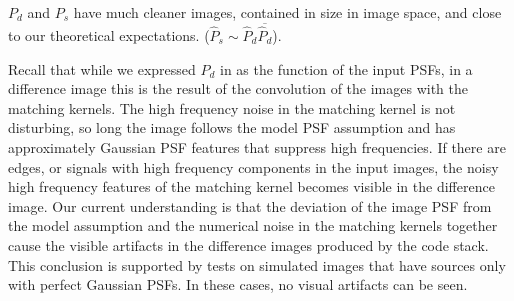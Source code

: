 %
\par \(P_d\) and \(P_s\) have much cleaner images, contained in size
in image space, and close to our theoretical
expectations. (\(\hat{P}_s \sim \hat{P}_d \overline{\hat{P}_d}\)).
%
\par Recall that while we expressed \(P_d\) in  as the
function of the input PSFs, in a difference image this is the result
of the convolution of the images with the matching kernels.  The high
frequency noise in the matching kernel is not disturbing, so long the
image follows the model PSF assumption and has approximately Gaussian
PSF features that suppress high frequencies. If there are edges, or
signals with high frequency components in the input images, the noisy
high frequency features of the matching kernel becomes visible in the
difference image. Our current understanding is that the deviation of
the image PSF from the model assumption and the numerical noise
in the matching kernels together cause the visible artifacts in the
difference images produced by the code stack. This conclusion is
supported by tests on simulated images that have sources only with
perfect Gaussian PSFs. In these cases, no visual artifacts can be seen.
%
